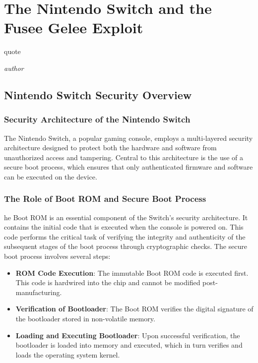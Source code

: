 
\chapter{The Nintendo Switch and the Fusee Gelee Exploit}
\epigraph{quote}{\textit{author}}

\section{Nintendo Switch Security Overview}

\subsection{Security Architecture of the Nintendo Switch}

The Nintendo Switch, a popular gaming console, employs a multi-layered security architecture designed to protect both the hardware and software from unauthorized access and tampering. Central to this architecture is the use of a secure boot process, which ensures that only authenticated firmware and software can be executed on the device.

\subsection{The Role of Boot ROM and Secure Boot Process}

he Boot ROM is an essential component of the Switch's security architecture. It contains the initial code that is executed when the console is powered on. This code performs the critical task of verifying the integrity and authenticity of the subsequent stages of the boot process through cryptographic checks. The secure boot process involves several steps:

\begin{itemize}
    \item \textbf{ROM Code Execution}: The immutable Boot ROM code is executed first. This code is hardwired into the chip and cannot be modified post-manufacturing.
    \item \textbf{Verification of Bootloader}: The Boot ROM verifies the digital signature of the bootloader stored in non-volatile memory.
    \item \textbf{Loading and Executing Bootloader}: Upon successful verification, the bootloader is loaded into memory and executed, which in turn verifies and loads the operating system kernel.
\end{itemize}

